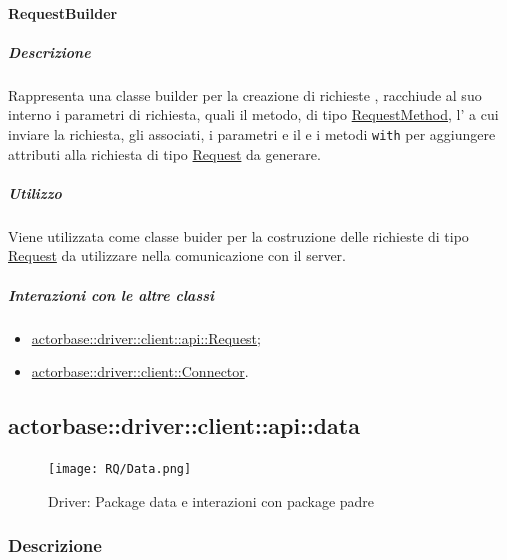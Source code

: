 \documentclass{scalatekids-article}
\begin{document}

\paragraph{RequestBuilder}
\label{sec:actorbase::driver::client::api::RequestBuilder}

\subparagraph{Descrizione}

Rappresenta una classe builder per la creazione di richieste ,
racchiude al suo interno i parametri di richiesta, quali il metodo, di tipo
\hyperref[sec:actorbase::driver::client::api::RequestMethod]{RequestMethod},
l' a cui inviare la richiesta, gli  
associati, i parametri e il  e i metodi \verb=with= per
aggiungere attributi alla richiesta di tipo
\hyperref[sec:actorbase::driver::client::api::Request]{Request} da generare.

\subparagraph{Utilizzo}

Viene utilizzata come classe buider per la costruzione delle richieste
 di tipo
\hyperref[sec:actorbase::driver::client::api::Request]{Request} da utilizzare
nella comunicazione con il server.

\subparagraph{Interazioni con le altre classi}

\begin{itemize}
\item \hyperref[sec:actorbase::driver::client::api::Request]{actorbase::driver::client::api::Request};
\item \hyperref[sec:actorbase::driver::client::Connector]{actorbase::driver::client::Connector}.
\end{itemize}


\subsection{actorbase::driver::client::api::data}
\label{sec:actorbase::driver::client::api::data}

\begin{figure}[H]
  \begin{center}
    \texttt{[image: RQ/Data.png]}
    \caption{Driver: Package data e interazioni con package padre}
  \end{center}
\end{figure}

\subsubsection{Descrizione}
\end{document}
